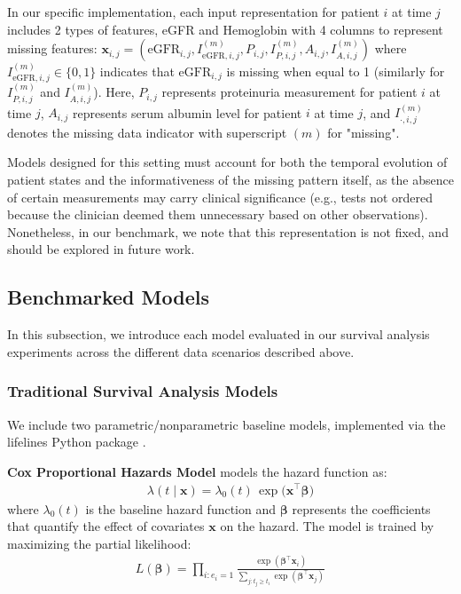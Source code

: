 In our specific implementation, each input representation for patient $i$ at time $j$ includes 2 types of features, eGFR and Hemoglobin with 4 columns to represent missing features: $\mathbf{x}_{i,j} = (\text{eGFR}_{i,j}, I^{(m)}_{\text{eGFR},i,j}, P_{i,j}, I^{(m)}_{P,i,j}, A_{i,j}, I^{(m)}_{A,i,j})$ where $I^{(m)}_{\text{eGFR},i,j} \in \{0,1\}$ indicates that $\text{eGFR}_{i,j}$ is missing when equal to 1 (similarly for $I^{(m)}_{P,i,j}$ and $I^{(m)}_{A,i,j}$). Here, $P_{i,j}$ represents proteinuria measurement for patient $i$ at time $j$, $A_{i,j}$ represents serum albumin level for patient $i$ at time $j$, and $I^{(m)}_{\cdot,i,j}$ denotes the missing data indicator with superscript $(m)$ for "missing".




Models designed for this setting must account for both the temporal evolution of patient states and the informativeness of the missing pattern itself, as the absence of certain measurements may carry clinical significance (e.g., tests not ordered because the clinician deemed them unnecessary based on other observations). Nonetheless, in our benchmark, we note that this representation is not fixed, and should be explored in future work.

\subsection{Benchmarked Models} \label{sec:models}

In this subsection, we introduce each model evaluated in our survival analysis experiments across the different data scenarios described above.

\subsubsection{Traditional Survival Analysis Models}
We include two parametric/nonparametric baseline models, implemented via the lifelines Python package \citep{davidson2019lifelines}.

\textbf{Cox Proportional Hazards Model} \citep{cox1972regression} models the hazard function as:
\begin{align}
\lambda(t \mid \mathbf{x}) = \lambda_0(t)\,\exp\bigl(\mathbf{x}^\intercal \boldsymbol{\beta}\bigr)
\end{align}
where $\lambda_0(t)$ is the baseline hazard function and $\boldsymbol{\beta}$ represents the coefficients that quantify the effect of covariates $\mathbf{x}$ on the hazard. The model is trained by maximizing the partial likelihood:
\begin{align}
L(\boldsymbol{\beta}) = \prod_{i:e_i=1} \frac{\exp(\boldsymbol{\beta}^\intercal \mathbf{x}_i)}{\sum_{j:t_j \geq t_i} \exp(\boldsymbol{\beta}^\intercal \mathbf{x}_j)}
\end{align}

